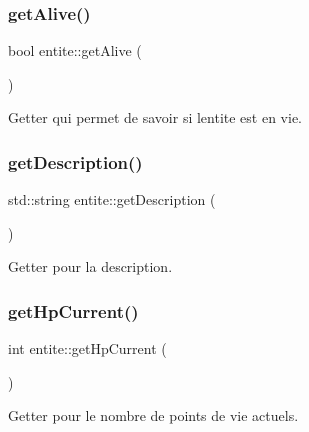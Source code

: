 \mbox{\label{classentite_a5a39811eb0c12ae85a23f152c8ba6d58}} 
\subsubsection{\texorpdfstring{get\+Alive()}{getAlive()}}
{\footnotesize\ttfamily bool entite\+::get\+Alive (\begin{DoxyParamCaption}{ }\end{DoxyParamCaption})}



Getter qui permet de savoir si l\textquotesingle{}entite est en vie. 

\mbox{\label{classentite_ab19b8d18b4d947c85063b2225bbb9144}} 
\subsubsection{\texorpdfstring{get\+Description()}{getDescription()}}
{\footnotesize\ttfamily std\+::string entite\+::get\+Description (\begin{DoxyParamCaption}{ }\end{DoxyParamCaption})}



Getter pour la description. 

\mbox{\label{classentite_ae41fa12581d2f94d5f6ae67fec4e56e9}} 
\subsubsection{\texorpdfstring{get\+Hp\+Current()}{getHpCurrent()}}
{\footnotesize\ttfamily int entite\+::get\+Hp\+Current (\begin{DoxyParamCaption}{ }\end{DoxyParamCaption})}



Getter pour le nombre de points de vie actuels. 

\mbox{\label{classentite_ab8e6c4dd900884cba5bec025f1e55999}} 
